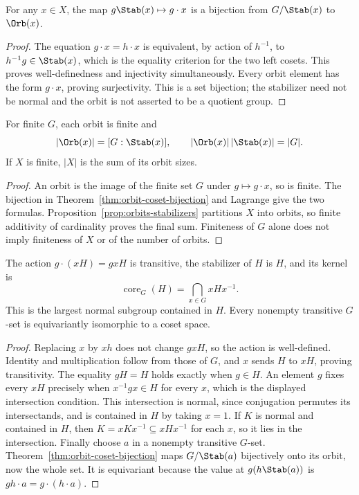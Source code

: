\begin{theorem}\label{thm:orbit-coset-bijection}
For any $x\in X$, the map $g\Stab(x)\mapsto g\cdot x$ is a bijection from $G/\Stab(x)$ to $\Orb(x)$.
\end{theorem}
\begin{proof}
The equation $g\cdot x=h\cdot x$ is equivalent, by action of $h^{-1}$, to $h^{-1}g\in\Stab(x)$, which is the equality criterion for the two left cosets. This proves well-definedness and injectivity simultaneously. Every orbit element has the form $g\cdot x$, proving surjectivity. This is a set bijection; the stabilizer need not be normal and the orbit is not asserted to be a quotient group.
\end{proof}

\begin{corollary}\label{cor:orbit-stabilizer-count}
For finite $G$, each orbit is finite and
\[
 |\Orb(x)|=[G:\Stab(x)],\qquad
 |\Orb(x)|\,|\Stab(x)|=|G|.
\]
If $X$ is finite, $|X|$ is the sum of its orbit sizes.
\end{corollary}
\begin{proof}
An orbit is the image of the finite set $G$ under $g\mapsto g\cdot x$, so is finite. The bijection in Theorem~\ref{thm:orbit-coset-bijection} and Lagrange give the two formulas. Proposition~\ref{prop:orbits-stabilizers} partitions $X$ into orbits, so finite additivity of cardinality proves the final sum. Finiteness of $G$ alone does not imply finiteness of $X$ or of the number of orbits.
\end{proof}

\begin{theorem}\label{thm:coset-action-core}
The action $g\cdot(xH)=gxH$ is transitive, the stabilizer of $H$ is $H$, and its kernel is
\[
 \operatorname{core}_G(H)=\bigcap_{x\in G}xHx^{-1}.
\]
This is the largest normal subgroup contained in $H$. Every nonempty transitive $G$-set is equivariantly isomorphic to a coset space.
\end{theorem}
\begin{proof}
Replacing $x$ by $xh$ does not change $gxH$, so the action is well-defined. Identity and multiplication follow from those of $G$, and $x$ sends $H$ to $xH$, proving transitivity. The equality $gH=H$ holds exactly when $g\in H$. An element $g$ fixes every $xH$ precisely when $x^{-1}gx\in H$ for every $x$, which is the displayed intersection condition. This intersection is normal, since conjugation permutes its intersectands, and is contained in $H$ by taking $x=1$. If $K$ is normal and contained in $H$, then $K=xKx^{-1}\subseteq xHx^{-1}$ for each $x$, so it lies in the intersection. Finally choose $a$ in a nonempty transitive $G$-set. Theorem~\ref{thm:orbit-coset-bijection} maps $G/\Stab(a)$ bijectively onto its orbit, now the whole set. It is equivariant because the value at $g(h\Stab(a))$ is $gh\cdot a=g\cdot(h\cdot a)$.
\end{proof}

